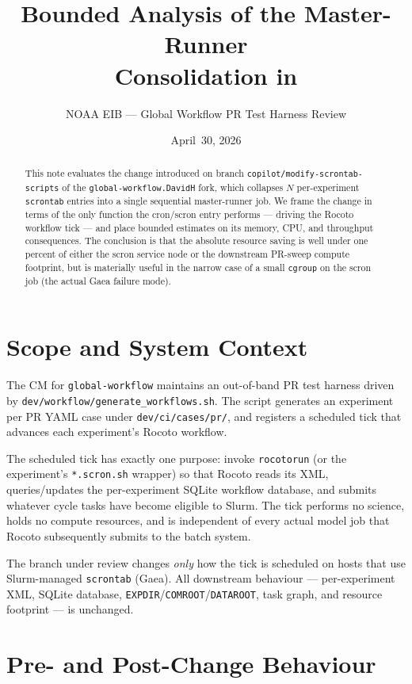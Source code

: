 \documentclass[11pt]{article}
\title{Bounded Analysis of the \code{scrontab} Master-Runner\\
       Consolidation in \code{generate\_workflows.sh}}
\author{NOAA EIB --- Global Workflow PR Test Harness Review}
\date{April~30, 2026}
\newcommand{\code}[1]{\texttt{#1}}
\begin{document}
\maketitle

\begin{abstract}
This note evaluates the change introduced on branch
\code{copilot/modify-scrontab-scripts} of the
\code{global-workflow.DavidH} fork, which collapses $N$ per-experiment
\code{scrontab} entries into a single sequential master-runner job.
We frame the change in terms of the only function the cron/scron entry
performs --- driving the Rocoto workflow tick --- and place bounded
estimates on its memory, CPU, and throughput consequences. The
conclusion is that the absolute resource saving is well under one
percent of either the scron service node or the downstream PR-sweep
compute footprint, but is materially useful in the narrow case of a
small \code{cgroup} on the scron job (the actual Gaea failure mode).
\end{abstract}

\section{Scope and System Context}
\label{sec:scope}

The CM for \code{global-workflow} maintains an out-of-band PR test
harness driven by \code{dev/workflow/generate\_workflows.sh}. The
script generates an experiment per PR YAML case under
\code{dev/ci/cases/pr/}, and registers a scheduled tick that advances
each experiment's Rocoto workflow.

The scheduled tick has exactly one purpose: invoke
\code{rocotorun} (or the experiment's \code{*.scron.sh} wrapper) so
that Rocoto reads its XML, queries/updates the per-experiment SQLite
workflow database, and submits whatever cycle tasks have become
eligible to Slurm. The tick performs no science, holds no compute
resources, and is independent of every actual model job that Rocoto
subsequently submits to the batch system.

The branch under review changes \emph{only} how the tick is scheduled
on hosts that use Slurm-managed \code{scrontab} (Gaea). All
downstream behaviour --- per-experiment XML, SQLite database,
\code{EXPDIR}/\code{COMROOT}/\code{DATAROOT}, task graph, and resource
footprint --- is unchanged.

\section{Pre- and Post-Change Behaviour}
\label{sec:behaviour}
\end{document}
